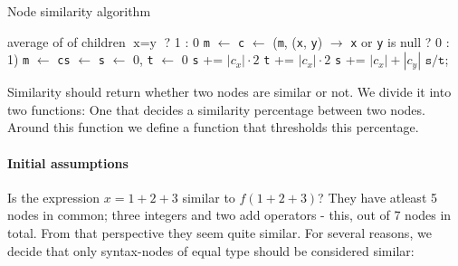 \documentclass[11pt]{article}
\begin{document}
\begin{algorithm}
  \caption{Node similarity algorithm}
  \label{SimilarityAlgorithm}
\begin{algorithmic}
		\State {}
		\State \Return average of  of children
		\State \Return $ \text{x} = \text{y}$ ? 1 : 0
		\State \texttt{m} $\gets$ 
		\State \texttt{c} $\gets$  (\texttt{m}, (\texttt{x}, \texttt{y}) $\rightarrow$ \texttt{x} or \texttt{y} is null ? 0 : 1)
		\State \Return {}
		\State \texttt{m} $\gets$ 
		\State \texttt{cs} $\gets$ 
		\State \texttt{s} $\gets$ 0, \texttt{t} $\gets$ 0
				\State \texttt{s} += $|c_x| \cdot 2$
				\State \texttt{t} += $|c_x| \cdot 2$
			\Else
				\State \texttt{s} += $|c_x| + |c_y|$
			\EndIf
		\State \Return $ \texttt{s} / \texttt{t} $;
		\EndFor
	\EndIf
\EndFunction
\end{algorithmic}
\end{algorithm}


Similarity should return whether two nodes are similar or not. We divide it into two functions:  One that decides a similarity percentage between two nodes. Around this function we define a function that thresholds this percentage.

\paragraph{Initial assumptions} Is the expression $x=1+2+3$ similar to $f(1+2+3)$? They have atleast 5 nodes in common; three integers and two add operators - this, out of 7 nodes in total. From that perspective they seem quite similar. For several reasons, we decide that only syntax-nodes of equal type should be considered similar:
\end{document}
